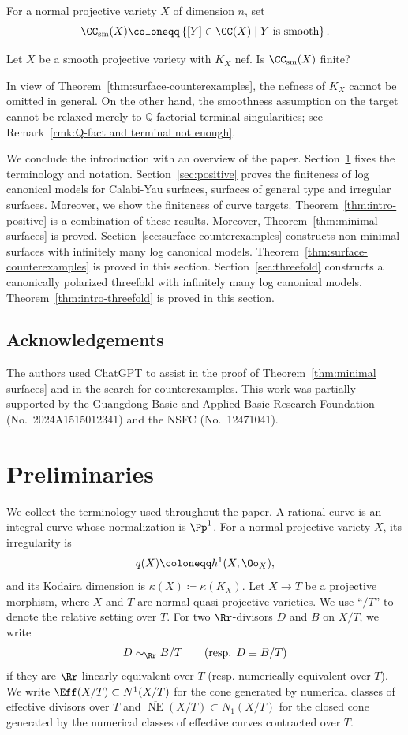 \documentclass[12pt]{amsart}
\newcommand{\NE}{\overline{\operatorname{NE}}}
\begin{document}
For a normal projective variety $X$ of dimension $n$, set
\[
   \CC_{\mathrm{sm}}(X)
   \coloneqq
   \left\{
   [Y] \in \CC(X) \mid Y \text{ is smooth}
   \right\}.
\]

\begin{question}\label{que:smooth-minimal-model-finiteness}
Let $X$ be a smooth projective variety with $K_X$ nef. Is
$\CC_{\mathrm{sm}}(X)$ finite?
\end{question}

In view of Theorem~\ref{thm:surface-counterexamples}, the nefness of $K_X$
cannot be omitted in general. On the other hand, the smoothness assumption
on the target cannot be relaxed merely to $\mathbb Q$-factorial terminal
singularities; see Remark~\ref{rmk:Q-fact and terminal not enough}.

We conclude the introduction with an overview of the paper. Section~\ref{sec:preliminaries} fixes the terminology and notation. Section~\ref{sec:positive} proves the finiteness of log canonical models for Calabi-Yau surfaces, surfaces of general type and irregular surfaces. Moreover, we show the finiteness of curve targets. Theorem~\ref{thm:intro-positive} is a combination of these results. Moreover, Theorem~\ref{thm:minimal surfaces} is proved. Section~\ref{sec:surface-counterexamples} constructs non-minimal surfaces with infinitely many log canonical models. Theorem~\ref{thm:surface-counterexamples} is proved in this section. Section~\ref{sec:threefold} constructs a canonically polarized threefold with infinitely many log canonical models. Theorem~\ref{thm:intro-threefold} is proved in this section.

\subsection*{Acknowledgements}
The authors used ChatGPT to assist in the proof of Theorem~\ref{thm:minimal surfaces} and in the search for counterexamples. This work was partially supported by the Guangdong Basic and Applied Basic Research Foundation (No.~2024A1515012341) and the NSFC (No.~12471041).




\section{Preliminaries}\label{sec:preliminaries}

We collect the terminology used throughout the paper. A rational curve is an integral curve whose normalization is $\Pp^1$. For a normal projective variety $X$, its irregularity is
\[
q(X)\coloneqq h^1(X,\Oo_X),
\]
and its Kodaira dimension is $\kappa(X)\coloneqq\kappa(K_X)$. Let $X\to T$ be a projective morphism, where $X$ and $T$ are normal
quasi-projective varieties. We use ``$/T$'' to denote the relative
setting over $T$. For two $\Rr$-divisors $D$ and $B$ on $X/T$, we write
\[
D\sim_{\Rr}B/T
\qquad
(\text{resp. }D\equiv B/T)
\]
if they are $\Rr$-linearly equivalent over $T$ (resp. numerically equivalent over $T$). We write $\Eff(X/T) \subset N^1(X/T)$ for the cone generated by numerical classes of effective divisors over $T$ and $\NE(X/T)\subset N_1(X/T)$ for the closed cone generated by the numerical classes of effective curves contracted over $T$.
\end{document}
